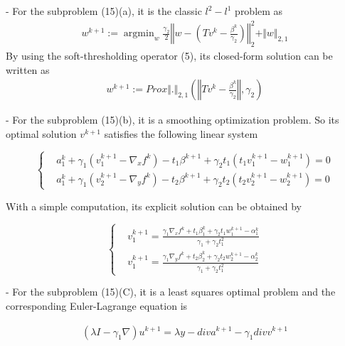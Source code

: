 \documentclass[hyperref]{ctexart}
\begin{document}
{\begin{multicols}{2}
		- For the subproblem (15)(a), it is the classic $l^2 - l^1$  problem as 
		\begin{equation}
			\begin{split}
				w^{k+1} :=  \mathop{\arg \min}_{w}  \frac{\gamma_2}{2} \left \Vert w- \left( Tv^k - \frac{\beta^k}{\gamma_2}\right)  \right \Vert^2_2 + \Vert w \Vert_{2,1}
			\end{split}
		\end{equation}
		By using the soft-thresholding operator (5), its closed-form solution can be written as
		\begin{equation}
			\begin{split}
				w^{k+1} :=  Prox \Vert . \Vert_{2,1}\left( \left \Vert  Tv^k - \frac{\beta^k}{\gamma_2}  \right \Vert , \gamma_2 \right) 
			\end{split}
		\end{equation}
	
		- For the subproblem (15)(b), it is a smoothing optimization problem. So its optimal 	solution $v^{k+1}$ satisfies the following linear system
		
		\begin{equation}\left\{
			\begin{split}
				& a^k_1 + \gamma_1(v_1^{k+1} - \nabla_x f^k) - t_1\beta^{k+1} + \gamma_2 t_1(t_1v_1^{k+1}-w_1^{k+1}) = 0\\
				& a^k_1 + \gamma_1(v_2^{k+1} - \nabla_y f^k) - t_2\beta^{k+1} + \gamma_2 t_2(t_2v_2^{k+1}-w_2^{k+1}) = 0
			\end{split}
			\right.
		\end{equation}

			
		With a simple computation, its explicit solution can be obtained by
		
		\begin{equation}\left\{
			\begin{split}
				& v_1^{k+1} = \frac{\gamma_1 \nabla_x f^k + t_1\beta_1^k  + \gamma_2 t_1 w_1 ^{k+1} - \alpha_1^k}{\gamma_1 + \gamma_2 t_1^2}\\
				& v_1^{k+1} = \frac{\gamma_1 \nabla_y f^k + t_2\beta_2^k  + \gamma_2 t_2 w_2 ^{k+1} - \alpha_2^k}{\gamma_1 + \gamma_2 t_1^2}
			\end{split}
			\right.
		\end{equation}
		
		- For the subproblem (15)(C), it is a least squares optimal problem and the corresponding 	Euler-Lagrange equation is
		
		\begin{equation}
			\begin{split}
				(\lambda I- \gamma_1 \nabla)u^{k+1} = \lambda y - div a^{k+1} - \gamma_1 div v^{k+1 }
			\end{split}
		\end{equation}
		

\end{multicols}}
\end{document}

